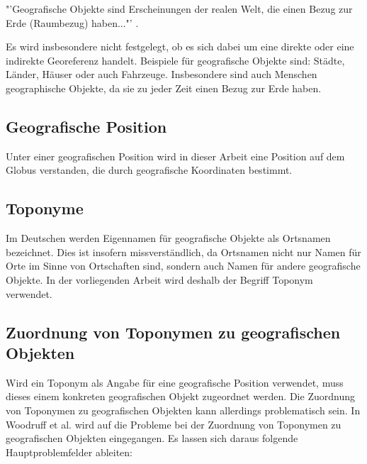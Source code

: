 			"'Geografische Objekte sind Erscheinungen der realen Welt, die einen Bezug zur Erde (Raumbezug) haben..."' \cite{ISO19110:2005}.

			Es wird insbesondere nicht festgelegt, ob es sich dabei um eine direkte oder eine indirekte Georeferenz handelt.
			Beispiele für geografische Objekte sind: Städte, Länder, Häuser oder auch Fahrzeuge.
			Insbesondere sind auch Menschen geographische Objekte, da sie zu jeder Zeit einen Bezug zur Erde haben.

		\subsection{Geografische Position}
		
			Unter einer geografischen Position wird in dieser Arbeit eine Position auf dem Globus verstanden, die durch geografische Koordinaten bestimmt.

		\subsection{Toponyme}  
			
			Im Deutschen werden Eigennamen für geografische Objekte als Ortsnamen bezeichnet. 
			Dies ist insofern missverständlich, da Ortsnamen nicht nur Namen für Orte im Sinne von Ortschaften sind, sondern auch Namen für andere geografische Objekte.
			In der vorliegenden Arbeit wird deshalb der Begriff Toponym verwendet. 

		\subsection{Zuordnung von Toponymen zu geografischen Objekten} \label{sec:zuordnungToponymeGeogObj}

			Wird ein Toponym als Angabe für eine geografische Position verwendet, muss dieses einem konkreten geografischen Objekt zugeordnet werden. 
			Die Zuordnung von Toponymen zu geografischen Objekten kann allerdings problematisch sein.
			In Woodruff et al. \cite{Woodruff1994} wird auf die Probleme bei der Zuordnung von Toponymen zu geografischen Objekten eingegangen.
			Es lassen sich daraus folgende Hauptproblemfelder ableiten:

